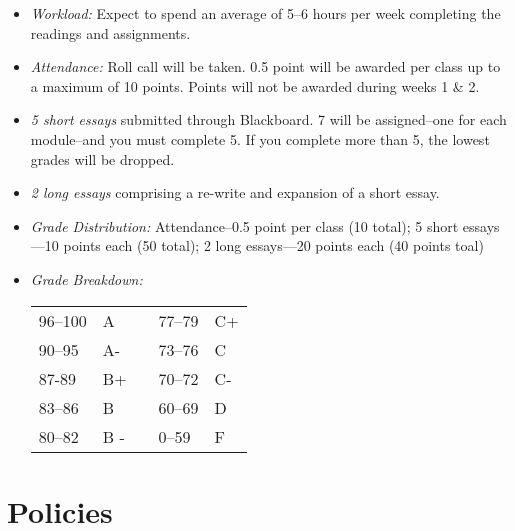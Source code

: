 \documentclass[article,oneside]{memoir}
\begin{document}
\begin{itemize}
\item \textit{Workload:} Expect to spend an average of 5--6 hours per week  completing the readings and assignments.

\item \textit{Attendance:} Roll call will be taken. 0.5 point will be awarded per class up to a maximum of 10 points. Points will not be awarded during weeks 1 \& 2. 

\item \textit{5 short essays} submitted through Blackboard. 7 will be assigned--one for each module--and you must complete 5. If you complete more than 5, the lowest grades will be dropped.  
 
\item \textit{2 long essays} comprising a re-write and expansion of a short essay. 



\item \textit{Grade Distribution:} Attendance--0.5 point per class (10 total); 5 short essays---10 points each (50 total); 2 long essays---20 points each (40 points toal)

\item \textit{Grade Breakdown:}

 \begin{tabular}{ | l | l | p{2cm} | l | l | }
    \hline 
96--100 & A  & &  77--79 &  C+ \\  
90--95 & A- & &  73--76 & C \\
87-89 & B+ &  &  70--72 & C- \\ 
83--86 & B  & &  60--69 & D\\
80--82 & B - & & 0--59 & F\\ \hline
    \end{tabular}


\end{itemize}





\section{Policies}
\end{document}

